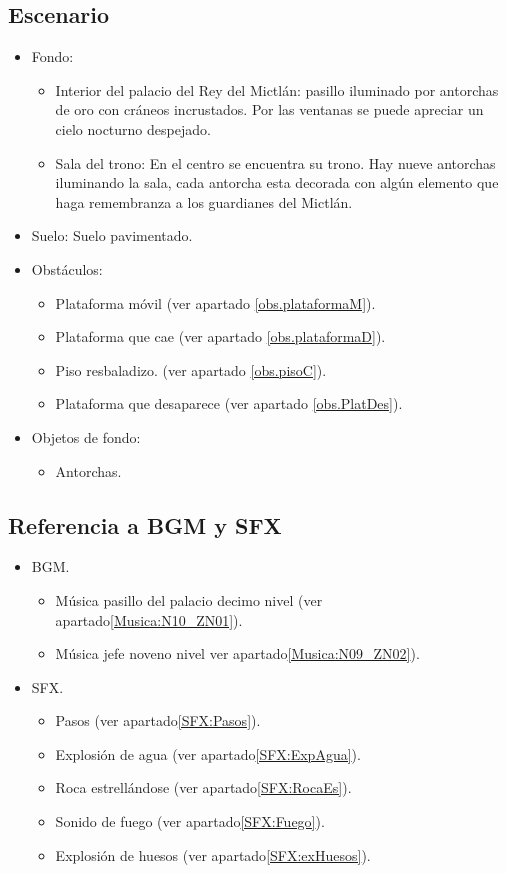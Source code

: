 	\subsection{Escenario}
\begin{itemize} 
	\item Fondo: 
	\begin{itemize}
		\item Interior del palacio del Rey del Mictlán: pasillo iluminado por antorchas de oro con cráneos incrustados. Por las ventanas se puede apreciar un cielo nocturno despejado.
		\item Sala del trono: En el centro se encuentra su trono. Hay nueve antorchas iluminando la sala, cada antorcha esta decorada con algún elemento que haga remembranza a los guardianes del Mictlán. 
	\end{itemize}
	\item Suelo: Suelo pavimentado.
	\item Obstáculos:
	\begin{itemize}
			\item Plataforma móvil (ver apartado \ref{obs.plataformaM}).
			\item Plataforma que cae (ver apartado \ref{obs.plataformaD}).
			\item Piso resbaladizo. (ver apartado \ref{obs.pisoC}).
			\item Plataforma que desaparece (ver apartado \ref{obs.PlatDes}).
		\end{itemize}
	\item Objetos de fondo: 
		\begin{itemize}
			\item Antorchas.
		\end{itemize}
\end{itemize}	
	\subsection{Referencia a BGM y SFX}
	\begin{itemize}
		\item BGM.
			\begin{itemize}
				\item Música pasillo del palacio decimo nivel (ver apartado\ref{Musica:N10_ZN01}).
				\item Música jefe noveno nivel ver apartado\ref{Musica:N09_ZN02}).
			\end{itemize}
		\item SFX.
			\begin{itemize}
				\item Pasos (ver apartado\ref{SFX:Pasos}).
				\item Explosión de agua (ver apartado\ref{SFX:ExpAgua}).
				\item Roca estrellándose (ver apartado\ref{SFX:RocaEs}).
				\item Sonido de fuego (ver apartado\ref{SFX:Fuego}).
				\item Explosión de huesos (ver apartado\ref{SFX:exHuesos}).
			\end{itemize}
	\end{itemize}

